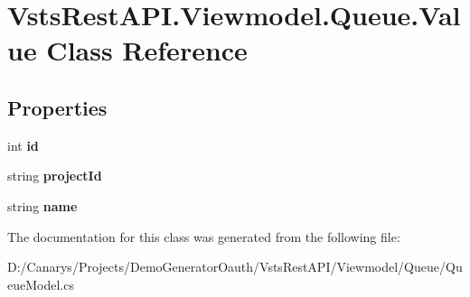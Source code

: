 \hypertarget{class_vsts_rest_a_p_i_1_1_viewmodel_1_1_queue_1_1_value}{}\section{Vsts\+Rest\+A\+P\+I.\+Viewmodel.\+Queue.\+Value Class Reference}
\label{class_vsts_rest_a_p_i_1_1_viewmodel_1_1_queue_1_1_value}
\subsection*{Properties}
\begin{DoxyCompactItemize}
\item 
\mbox{\label{class_vsts_rest_a_p_i_1_1_viewmodel_1_1_queue_1_1_value_a17e35cd3f104c34ed32e81d044b0086f}} 
int {\bfseries id}
\item 
\mbox{\label{class_vsts_rest_a_p_i_1_1_viewmodel_1_1_queue_1_1_value_a549176f8b14f23448ee05baec3e5cef5}} 
string {\bfseries project\+Id}
\item 
\mbox{\label{class_vsts_rest_a_p_i_1_1_viewmodel_1_1_queue_1_1_value_a6cd4d3a7617dd2d25ed49125661ab730}} 
string {\bfseries name}
\end{DoxyCompactItemize}


The documentation for this class was generated from the following file\+:\begin{DoxyCompactItemize}
\item 
D\+:/\+Canarys/\+Projects/\+Demo\+Generator\+Oauth/\+Vsts\+Rest\+A\+P\+I/\+Viewmodel/\+Queue/Queue\+Model.\+cs\end{DoxyCompactItemize}
